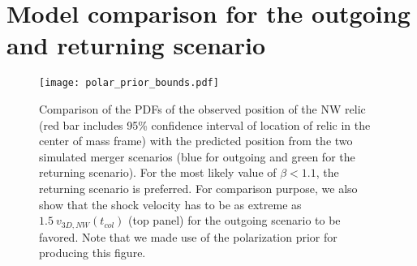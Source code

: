 \section{Model comparison for the outgoing and returning scenario}
\label{app:Bayes_factor}
\begin{figure}
	\texttt{[image: polar\_prior\_bounds.pdf]}
	\caption{Comparison of the PDFs of the observed position of the NW relic (red bar
		includes 95\% confidence interval of location of relic in the center of
		mass frame) with the	predicted position from the two simulated merger scenarios (blue for
	outgoing and green for the returning scenario). 
	For the most likely value of $\beta < 1.1$, the returning scenario is preferred. 
	For comparison purpose, we also show that the shock velocity has to
	be as extreme as $1.5~v_{3D, NW}(t_{col})$ (top panel) for the outgoing
	scenario to be favored. 
	Note that we made use of the	polarization prior for producing this figure. 
	\label{fig: positionprior}}
\end{figure}

